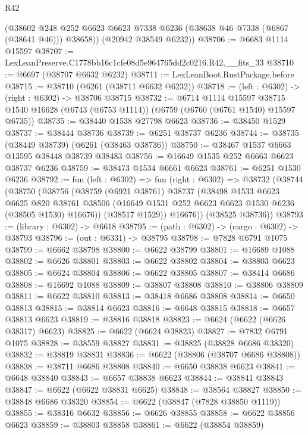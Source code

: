 \begin{lexlean}{R42}
\begin{coremodule}
{        (@38602 @248 @252 @6623 @6623 @7338 @6236 (@38638 @46 @7338 (@6867 (@38641 @46))) @38658))
      (@20942 @38549 @6232))
@38706 := @6683 @1114 @15597
@38707 := LexLeanPreserve.C1778bb16c1cfe08d5e964765dd2c0216.R42.__fits_33
@38710 := @6697 (@38707 @6632 @6232)
@38711 := LexLeanBoot.RustPackage.before
@38715 := @38710 (@6261 (@38711 @6632 @6232))
@38718 := (left : @6302) -> (right : @6302) -> @38706 @38715
@38732 := @6714
    @1114
    @15597
    @38715
    @1540
    @16628
    (@6743 (@6753 @1114))
    (@6759 (@6760 (@6761 @1540) @15597 @6735))
@38735 := @38440 @1538 @27798 @6623
@38736 := @38450 @1529
@38737 := @38444 @38736
@38739 := @6251 @38737 @6236
@38744 := @38735 (@38449 @38739) (@6261 (@38463 @38736))
@38750 := @38467 @1537 @6663 @13595 @38448 @38739 @38483
@38756 := @16649 @1535 @252 @6663 @6623 @38737 @6236
@38759 := @38473 @1534 @6661 @6623
@38761 := @6251 @1530 @6236
@38792 := fun (left : @6302) =>
  fun (right : @6302) =>
  @38732
    (@38744
      (@38750
        (@38756
          (@38759
            (@6921 @38761)
            @38737
            (@38498
              @1533
              @6623
              @6625
              @820
              @38761
              @38506
              (@16649 @1531 @252 @6623 @6623 @1530 @6236 (@38505 @1530) @16676))
            (@38517 @1529))
          @16676))
      (@38525 @38736))
@38793 := (library : @6302) -> @6618
@38795 := (path : @6302) -> (cargo : @6302) -> @38793
@38796 := (out : @6331) -> @38795
@38798 := @7828 @6791 @1075
@38799 := @6662 @38798
@38800 := @6622 @38799
@38801 := @16689 @1088
@38802 := @6626 @38801
@38803 := @6622 @38802
@38804 := @38803 @6623
@38805 := @6624 @38804
@38806 := @6622 @38805
@38807 := @38414 @6686
@38808 := @16692 @1088
@38809 := @38807 @38808
@38810 := @38806 @38809
@38811 := @6622 @38810
@38813 := @38418 @6686 @38808
@38814 := @6650 @38813
@38815 := @38814 @6623
@38816 := @6648 @38815
@38818 := @6657 @38813 @6623
@38819 := @38816 @38818
@38823 := @6624 (@6622 (@6626 @38317) @6623)
@38825 := @6622 (@6624 @38823)
@38827 := @7832 @6791 @1075
@38828 := @38559 @38827
@38831 := @38825 (@38828 @6686 @38320)
@38832 := @38819 @38831
@38836 := @6622 (@38806 (@38707 @6686 @38808))
@38838 := @38711 @6686 @38808
@38840 := @6650 @38838 @6623
@38841 := @6648 @38840
@38843 := @6657 @38838 @6623
@38844 := @38841 @38843
@38847 := @6622 (@6622 @38831 @6625)
@38848 := @38564 @38827
@38850 := @38848 @6686 @38320
@38854 := @6622 (@38847 (@7828 @38850 @1119))
@38855 := @38316 @6632
@38856 := @6626 @38855
@38858 := @6622 @38856 @6623
@38859 := @38803 @38858
@38861 := @6622 (@38854 @38859)
}
\end{coremodule}
\end{lexlean}
